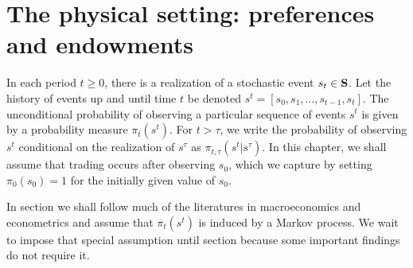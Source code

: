 \section{The physical setting: preferences and endowments}
In each period $t\geq 0$, there is a realization of a stochastic
event $s_t \in {\bf S}$. Let the history of events up and until time $t$
be denoted $s^t = [s_0, s_{1}, \ldots, s_{t-1}, s_t]$.
The unconditional
probability of observing a particular sequence of events $s^t$ is
given by a probability measure $\pi_t(s^t)$. For $t > \tau$, we write the probability
of observing $s^t$ conditional on the realization of $s^\tau$
as $\pi_{t,\tau}(s^t\vert s^\tau)$.
In this chapter, we shall assume that trading occurs after
observing $s_0$,
which we capture by setting $\pi_0(s_0)=1$ for the initially
given value of $s_0$.

 In section  we shall follow much of the
 literatures in macroeconomics and econometrics and assume that
 $\pi_t(s^t)$ is induced by  a Markov process. We wait to impose
 that special assumption until section  because some important findings do not
 require it.




